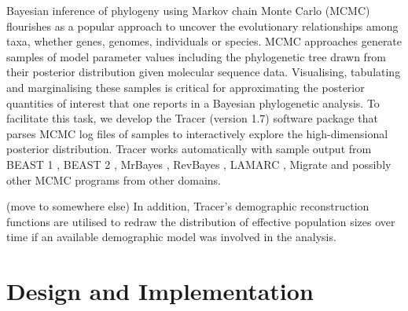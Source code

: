 \documentclass{bioinfo}
\begin{document}
Bayesian inference of phylogeny using Markov chain Monte Carlo (MCMC) \citep{rannala1996probability,mau1999bayesian} flourishes as a popular approach to uncover the evolutionary relationships among taxa, whether genes, genomes, individuals or species.
MCMC approaches generate samples of model parameter values including the phylogenetic tree drawn from their posterior distribution given molecular sequence data.
Visualising, tabulating and marginalising these samples is critical for approximating the posterior quantities of interest that one reports in a Bayesian phylogenetic analysis.
To facilitate this task, we develop the Tracer (version 1.7) software package that parses MCMC log files of samples to interactively explore the high-dimensional posterior distribution.
%
Tracer works automatically with sample output from
BEAST 1 \citep{drummond2012bayesian}, BEAST 2 \citep{bouckaert2014beast2}, MrBayes \citep{ronquist2012mrbayes}, RevBayes \citep{hohna2016revbayes}, LAMARC \citep{kuhner2006lamarc}, Migrate \citep{beerli2006comparison} and possibly other MCMC programs from other domains.

(move to somewhere else) In addition, Tracer's demographic reconstruction functions are utilised to redraw the distribution of effective population sizes over time if an available demographic model was involved in the analysis.



\section*{Design and Implementation}

\end{document}
